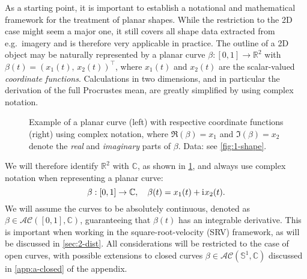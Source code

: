 \label{sec:2}
As a starting point, it is important to establish a notational and mathematical framework for the treatment of planar shapes.
While the restriction to the 2D case might seem a major one, it still covers all shape data extracted from e.g.\ imagery and is therefore very applicable in practice.
The outline of a 2D object may be naturally represented by a planar curve $\beta : [0,1] \rightarrow \mathbb{R}^2$ with $\beta(t) = (x_1(t),\, x_2(t))^\top$, where $x_1(t)$ and $x_2(t)$ are the scalar-valued \textit{coordinate functions}.
Calculations in two dimensions, and in particular the derivation of the full Procrustes mean, are greatly simplified by using complex notation.
\begin{figure}
  \centering
  \begin{subfigure}{.48\textwidth}
    \centering
  \end{subfigure}\hfill%
  \begin{subfigure}{.48\textwidth}
    \centering
    \begin{subfigure}{\textwidth}
      \centering
    \end{subfigure}
    \begin{subfigure}{\textwidth}
      \centering
    \end{subfigure}
  \end{subfigure}
  \caption{Example of a planar curve (left) with respective coordinate functions (right) using complex notation, where $\Re(\beta) = x_1$ and $\Im(\beta) = x_2$ denote the \emph{real} and \emph{imaginary} parts of $\beta$. Data: see \cref{fig:1-shape}.}
  \label{fig:2-curve}
\end{figure}
We will therefore identify $\mathbb{R}^2$ with $\mathbb{C}$, as shown in \cref{fig:2-curve}, and always use complex notation when representing a planar curve:
$$\beta : [0,1] \rightarrow \mathbb{C}, \quad \beta(t) = x_1(t) + \mathrm{i}\mkern1mu x_2(t).$$
We will assume the curves to be absolutely continuous, denoted as $\beta \in \mathcal{AC}([0,1], \mathbb{C})$, guaranteeing that $\beta(t)$ has an integrable derivative.
This is important when working in the square-root-velocity (SRV) framework, as will be discussed in \cref{sec:2-dist}.
All considerations will be restricted to the case of open curves, with possible extensions to closed curves $\beta \in \mathcal{AC}(\mathbb{S}^1, \mathbb{C})$ discussed in \cref{app:a-closed} of the appendix.


